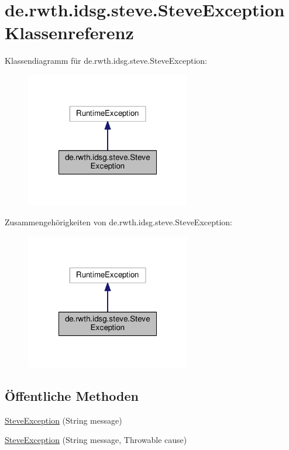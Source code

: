 \hypertarget{classde_1_1rwth_1_1idsg_1_1steve_1_1_steve_exception}{\section{de.\-rwth.\-idsg.\-steve.\-Steve\-Exception Klassenreferenz}
\label{classde_1_1rwth_1_1idsg_1_1steve_1_1_steve_exception}
}


Klassendiagramm für de.\-rwth.\-idsg.\-steve.\-Steve\-Exception\-:
\nopagebreak
\begin{figure}[H]
\begin{center}
\leavevmode
\includegraphics[width=204pt]{classde_1_1rwth_1_1idsg_1_1steve_1_1_steve_exception__inherit__graph}
\end{center}
\end{figure}


Zusammengehörigkeiten von de.\-rwth.\-idsg.\-steve.\-Steve\-Exception\-:
\nopagebreak
\begin{figure}[H]
\begin{center}
\leavevmode
\includegraphics[width=204pt]{classde_1_1rwth_1_1idsg_1_1steve_1_1_steve_exception__coll__graph}
\end{center}
\end{figure}
\subsection*{Öffentliche Methoden}
\begin{DoxyCompactItemize}
\item 
\hyperlink{classde_1_1rwth_1_1idsg_1_1steve_1_1_steve_exception_a60678566b5bc3dc292dfdc0dab7f9b52}{Steve\-Exception} (String message)
\item 
\hyperlink{classde_1_1rwth_1_1idsg_1_1steve_1_1_steve_exception_a5b5e6f2373fe77dcdc3524e8345e2444}{Steve\-Exception} (String message, Throwable cause)
\end{DoxyCompactItemize}


